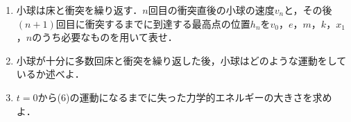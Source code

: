 \begin{enumerate}[I]
\begin{enumerate}[(1), resume]
    {\hzw}時刻$t = t_1$に，小球が床と初めて衝突する直前の小球の速さ$v_0$は$v_0 = \text{\boxkm{ア}{$m$，$k$，$h$，$x_1$}}$である．

    {\hzw}床と衝突した後，小球は位置$h_1 = \text{\boxkm{イ}{$v_0$，$e$，$m$，$k$，$x_1$}}$まで到達し，再び落下して床と衝突する．問2で考えた，小球と床が弾性衝突する場合の衝突の時間間隔$\varDelta t$と比較すると，小球が初めて床と衝突してから次に床と衝突するまでの時間間隔は｛ウ{\hzw}①長くなる{\hzw}②変化しない{\hzw}③短くなる｝．

    \item{\hzw}小球は床と衝突を繰り返す．$n$回目の衝突直後の小球の速度$v_n$と，その後$(n+1)$回目に衝突するまでに到達する最高点の位置$h_n$を$v_0$，$e$，$m$，$k$，$x_1$，$n$のうち必要なものを用いて表せ．
    \item {\hzw}小球が十分に多数回床と衝突を繰り返した後，小球はどのような運動をしているか述べよ．
    \item {\hzw}$t = 0$から(6)の運動になるまでに失った力学的エネルギーの大きさを求めよ．
  \end{enumerate}
\end{enumerate}
